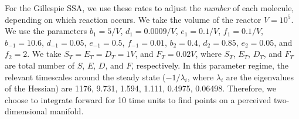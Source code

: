 \documentclass[aip,jcp,preprint]{revtex4-1}
\begin{document}
For the Gillespie SSA, we use these rates to adjust the {\em number} of each molecule, depending on which reaction occurs.
%
We take the volume of the reactor $V=10^5$.
%
We use the parameters $b_1=5/V$, $d_1=0.0009/V$, $e_1=0.1/V$, $f_1=0.1/V$, $b_{-1} = 10.6$, $d_{-1}=0.05$, $e_{-1}=0.5$, $f_{-1} =0.01$, $b_2=0.4$, $d_2=0.85$, $e_2=0.05$, and $f_2=2$.
%
We take $S_T=E_T=D_T=1V$, and $F_T=0.02V$, where $S_T$, $E_T$, $D_T$, and $F_T$ are total number of $S$, $E$, $D$, and $F$, respectively.
%
In this parameter regime, the relevant timescales around the steady state ($-1/\lambda_i$, where $\lambda_i$ are the eigenvalues of the Hessian) are 1176, 9.731, 1.594, 1.111, 0.4975, 0.06498.
%
Therefore, we choose to integrate forward for 10 time units to find points on a perceived two-dimensional manifold.
\end{document}
